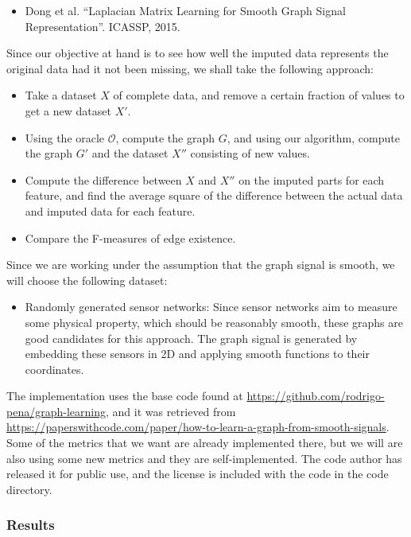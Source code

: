 \documentclass[a4paper]{article}
\newcommand{\nl}{\vspace{0.2cm}\\}
\newcommand{\mc}{\mathcal}
\begin{document}
\begin{itemize}
    \item Dong et al. ``Laplacian Matrix Learning for Smooth Graph Signal Representation''. ICASSP, 2015.
\end{itemize}

Since our objective at hand is to see how well the imputed data represents the original data had it not been missing, we shall take the following approach:
\begin{itemize}
    \item Take a dataset $X$ of complete data, and remove a certain fraction of values to get a new dataset $X'$.
    \item Using the oracle $\mc{O}$, compute the graph $G$, and using our algorithm, compute the graph $G'$ and the dataset $X''$ consisting of new values.
    \item Compute the difference between $X$ and $X''$ on the imputed parts for each feature, and find the average square of the difference between the actual data and imputed data for each
        feature.
    \item Compare the F-measures of edge existence.
\end{itemize}

Since we are working under the assumption that the graph signal is smooth, we will choose the following dataset:

\begin{itemize}
    \item Randomly generated sensor networks: Since sensor networks aim to measure some physical property, which should be reasonably smooth, these graphs are good candidates for this approach.
        The graph signal is generated by embedding these sensors in 2D and applying smooth functions to their coordinates.
\end{itemize}

The implementation uses the base code found at \href{https://github.com/rodrigo-pena/graph-learning}{https://github.com/rodrigo-pena/graph-learning}, and it was retrieved from
\href{https://paperswithcode.com/paper/how-to-learn-a-graph-from-smooth-signals}{https://paperswithcode.com/paper/how-to-learn-a-graph-from-smooth-signals}. Some of the metrics that we
want are already implemented there, but we will are also using some new metrics and they are self-implemented. The code author has released it for public use, and the license is included with the code in the code
directory.\nl

\subsubsection{Results}
\end{document}
